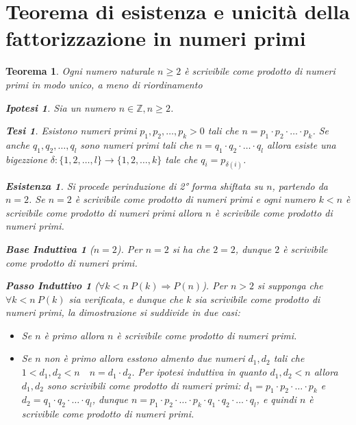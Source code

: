 \documentclass{article}
\makeatletter
\renewenvironment{proof}[1][\proofname]{\par
    \pushQED{\qed}%
    \normalfont \topsep6\p@\@plus6\p@\relax
    \trivlist
    \item\relax
    {\itshape
    #1\@addpunct{.}}\hspace\labelsep\ignorespaces
    }{%
    \popQED\endtrivlist\@endpefalse
}
\newtheorem{theorem}{Teorema}[part]
\newtheorem{ipothesis}[lemma]{Ipotesi}
\newtheorem{thesis}[lemma]{Tesi}
\theoremstyle{definition}
\newtheorem*{existence}{Esistenza}
\newtheorem*{base}{Base Induttiva}
\newtheorem*{step}{Passo Induttivo}
\makeatother
\begin{document}
\section{Teorema di esistenza e unicità della fattorizzazione in numeri primi}
\begin{theorem}
    Ogni numero naturale \(n\geq 2\) è scrivibile come prodotto di numeri primi in modo unico, a meno di riordinamento
    \begin{ipothesis}
        Sia un numero \(n\in\mathbb{Z}, n\geq 2\).
    \end{ipothesis}
    \begin{thesis}
        Esistono numeri primi \(p_1,p_2,\ldots,p_k>0\) tali che \(n=p_1\cdot p_2\cdot\ldots\cdot p_k\).
        Se anche \(q_1,q_2,\ldots,q_l\) sono numeri primi tali che \(n=q_1\cdot q_2\cdot\ldots\cdot q_l\) allora esiste una bigezzione \(\delta:\{1,2,\ldots,l\}\rightarrow \{1,2,\ldots,k\}\) tale che \(q_i=p_{\delta(i)}\).
    \end{thesis}
    \begin{proof}
        \begin{existence}
            Si procede perinduzione di 2° forma shiftata su \(n\), partendo da \(n=2\).
            Se \(n=2\) è scrivibile come prodotto di numeri primi e ogni numero \(k<n\) è scrivibile come prodotto di numeri primi allora \(n\) è scrivibile come prodotto di numeri primi.
            \begin{base}[$n=2$]
                Per \(n=2\) si ha che \(2=2\), dunque \(2\) è scrivibile come prodotto di numeri primi.
            \end{base}
            \begin{step}[$\forall k<n\ P(k)\Rightarrow P(n)$]
                Per \(n>2\) si supponga che \(\forall k<n\ P(k)\) sia verificata, e dunque che \(k\) sia scrivibile come prodotto di numeri primi, la dimostrazione si suddivide in due casi:
                \begin{itemize}
                    \item Se \(n\) è primo allora \(n\) è scrivibile come prodotto di numeri primi.
                    \item Se \(n\) non è primo allora esstono almento due numeri \(d_1,d_2\) tali che \(1<d_1,d_2<n\quad n=d_1\cdot d_2\). Per ipotesi induttiva in quanto \(d_1,d_2<n\) allora \(d_1,d_2\) sono scrivibili come prodotto di numeri primi: \(d_1=p_1\cdot p_2\cdot\ldots\cdot p_k\) e \(d_2=q_1\cdot q_2\cdot\ldots\cdot q_l\), dunque \(n=p_1\cdot p_2\cdot\ldots\cdot p_k\cdot q_1\cdot q_2\cdot\ldots\cdot q_l\), e quindi \(n\) è scrivibile come prodotto di numeri primi.

\end{itemize}
\end{step}
\end{existence}
\end{proof}
\end{theorem}
\end{document}
